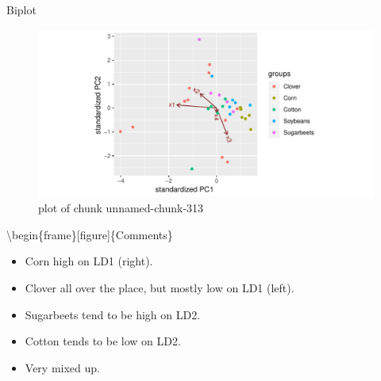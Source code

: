 \documentclass[ignorenonframetext,]{beamer}
\newenvironment{Shaded}{\begin{snugshade}}{\end{snugshade}}
\newcommand{\DataTypeTok}[1]{\textcolor[rgb]{0.13,0.29,0.53}{#1}}
\newcommand{\KeywordTok}[1]{\textcolor[rgb]{0.13,0.29,0.53}{\textbf{#1}}}
\newcommand{\NormalTok}[1]{#1}
\newcommand{\OperatorTok}[1]{\textcolor[rgb]{0.81,0.36,0.00}{\textbf{#1}}}
\begin{document}
\begin{frame}[fragile]{Biplot}
\protect\hypertarget{biplot-1}{}

\begin{Shaded}
\end{Shaded}

\begin{figure}
\centering
\includegraphics{figure/unnamed-chunk-313-1.pdf}
\caption{plot of chunk unnamed-chunk-313}
\end{figure}

\textbackslash{}begin\{frame\}{[}figure{]}\{Comments\}

\begin{itemize}
\item
  Corn high on LD1 (right).
\item
  Clover all over the place, but mostly low on LD1 (left).
\item
  Sugarbeets tend to be high on LD2.
\item
  Cotton tends to be low on LD2.
\item
  Very mixed up.
\end{itemize}

\end{frame}
\end{document}
